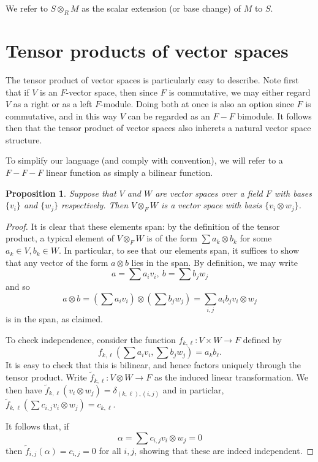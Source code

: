 \documentclass[12pt]{report}
\theoremstyle{plain}
\newtheorem{prop}[thm]{Proposition}
\newcommand{\til}{\widetilde}
\begin{document}
We refer to $S \otimes_R M$ as the scalar extension (or base change) of $M$
to $S$.

\section{Tensor products of vector spaces}

The tensor product of vector spaces is particularly easy to describe. Note
first that if $V$ is an $F$-vector space, then since $F$ is commutative, we
may either regard $V$ as a right or as a left $F$-module. Doing both at
once is also an option since $F$ is commutative, and in this way $V$ can be
regarded as an $F-F$ bimodule. It follows then that the tensor product of
vector spaces also inherets a natural vector space structure.

To simplify our language (and comply with convention), we will refer to a
$F-F-F$ linear function as simply a bilinear function.

\begin{prop} \label{tensor basis}
Suppose that $V$ and $W$ are vector spaces over a field $F$ with bases
$\{v_i\}$ and $\{w_j\}$ respectively. Then $V \otimes_F W$ is a vector
space with basis $\{v_i \otimes w_j\}$.
\end{prop}
\begin{proof}
It is clear that these elements span: by the definition of the tensor
product, a typical element of $V \otimes_F W$ is of the form $\sum a_k
\otimes b_k$ for some $a_k \in V, b_k \in W$. In particular, to see that
our elements span, it suffices to show that any vector of the form $a
\otimes b$ lies in the span. By definition, we may write
\[ a = \sum a_i v_i, \ b = \sum b_j w_j \]
and so
\[ a \otimes b = (\sum a_i v_i) \otimes (\sum b_j w_j) = \sum_{i,j} a_i b_j
v_i \otimes w_j \]
is in the span, as claimed.

To check independence, consider the function $f_{k,\ell} : V \times W \to F$
defined by
\[ f_{k, \ell} (\sum a_i v_i, \sum b_j w_j) = a_k b_\ell.\]
It is easy to check that this is bilinear, and hence factors uniquely
through the tensor product. Write $\til f_{k, \ell} : V \otimes W \to F$ as
the induced linear transformation. We then have 
$\til f_{k, \ell} (v_i \otimes w_j) = \delta_{(k, \ell), (i, j)}$ 
and in particlar, 
$\til f_{k, \ell}(\sum c_{i,j} v_i \otimes w_j) = c_{k, \ell}$.

It follows that, if 
\[\alpha = \sum c_{i, j} v_i \otimes w_j = 0\]
then $\til f_{i, j}(\alpha) = c_{i, j} = 0$ for all $i, j$, showing that
these are indeed independent.
\end{proof}
\end{document}
